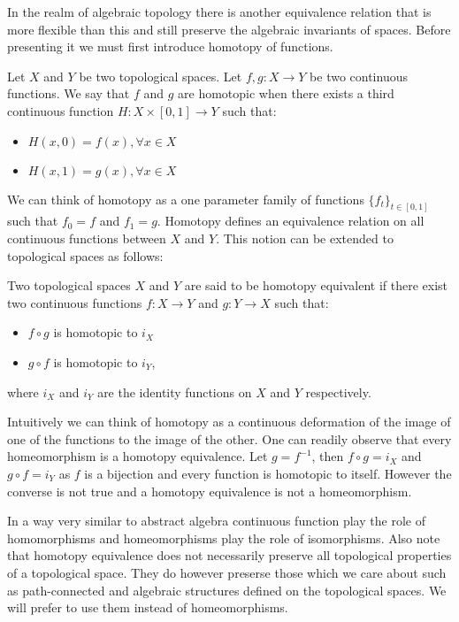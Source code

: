 In the realm of algebraic topology there is another equivalence relation that is more flexible than this and still preserve the algebraic invariants of spaces. Before presenting it we must first introduce homotopy of functions.


\begin{defn} Let $X$ and $Y$ be two topological spaces. Let $f, g: X \to Y$ be two continuous functions. We say that $f$ and $g$ are homotopic when there exists a third continuous function $H:X \times [0, 1] \to Y$ such that:  \end{defn}

\begin{itemize}
    \item $H(x, 0) = f(x), \forall x\in X$
    \item $H(x, 1) = g(x), \forall x\in X$
\end{itemize}

We can think of homotopy as a one parameter family of functions $\{f_t\}_{t \in [0, 1]}$ such that $f_0 = f$ and $f_1 = g$. Homotopy defines an equivalence relation on all continuous functions between $X$ and $Y$. This notion can be extended to topological spaces as follows:


\begin{defn} Two topological spaces $X$ and $Y$ are said to be homotopy equivalent if there exist two continuous functions $f: X \to Y$ and $g: Y \to X$ such that:  \end{defn}
\begin{itemize}
    \item $f \circ g$ is homotopic to $i_X$ 
    \item $g \circ f$ is homotopic to $i_Y$,
\end{itemize}

where $i_X$ and $i_Y$ are the identity functions on $X$ and $Y$ respectively.

Intuitively we can think of homotopy as a continuous deformation of the image of one of the functions to the image of the other. One can readily observe that every homeomorphism is a homotopy equivalence. Let $g = f^{-1}$, then $f \circ g = i_X$ and $g \circ f = i_Y$ as $f$ is a bijection and every function is homotopic to itself. However the converse is not true and a homotopy equivalence is not a homeomorphism.

In a way very similar to abstract algebra continuous function play the role of homomorphisms and homeomorphisms play the role of isomorphisms. Also note that homotopy equivalence does not necessarily preserve all topological properties of a topological space. They do however preserse those which we care about such as path-connected and algebraic structures defined on the topological spaces. We will prefer to use them instead of homeomorphisms. 


